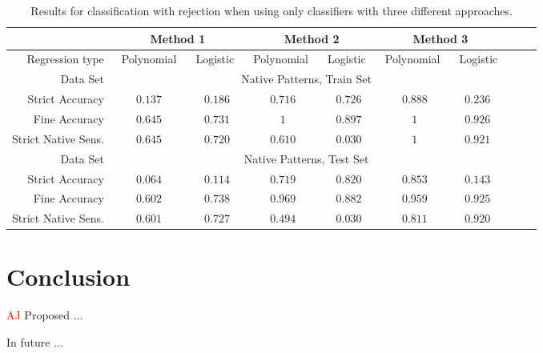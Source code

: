 \documentclass{llncs}
\begin{document}
\begin{table}[!b]
	\vspace{-12pt}
	\centering
	\caption{Results for classification with rejection when using only classifiers with three different approaches.}
	\vspace{-6pt}
	\setlength{\tabcolsep}{3pt}
	\renewcommand{\arraystretch}{1}
	{\footnotesize
		\begin{tabular}{|r||c|c|c||c|c|c||c|c|c|}
			\hline
			& \multicolumn{2}{c||}{Method 1} & \multicolumn{2}{c||}{Method 2} & \multicolumn{2}{c|}{Method 3}\\
			\hline
			Regression type & $\;\;$Polynomial$\;\;$ & $\,$Logistic$\;\;$ & $\,$Polynomial$\;\;$ & $\,$Logistic$\;\;$ & $\,$Polynomial$\;\;$ & $\,$Logistic  \\
			\hline
			Data Set & \multicolumn{6}{c|}{Native Patterns, Train Set} \\
			\hline
			Strict Accuracy     & $0.137$ & $0.186$ & $0.716$ & $0.726$ & $0.888$ & $0.236$ \\
			Fine Accuracy       & $0.645$     & $0.731$ & $1$ & $0.897$ & $1$ & $0.926$ \\
			Strict Native Sens. & $0.645$ & $0.720$ & $0.610$ & $0.030$ & $1$ & $0.921$ \\
			\hline
			Data Set & \multicolumn{6}{c|}{Native Patterns, Test Set} \\
			\hline
			Strict Accuracy  & $0.064$ & $0.114$ & $0.719$ & $0.820$ & $0.853$ & $0.143$ \\
			Fine Accuracy       & $0.602$ & $0.738$ & $0.969$ & $0.882$ & $0.959$ & $0.925$ \\
			Strict Native Sens. & $0.601$ & $0.727$ & $0.494$ & $0.030$ & $0.811$ & $0.920$ \\
			\hline
		\end{tabular}
	}
	\vspace{-6pt}
	\label{tab:NativeNoForeign2}
\end{table}

\section{Conclusion}
  \label{sec:Conclusion}

\textcolor{red} {AJ}
Proposed ...

In future ...
\end{document}
